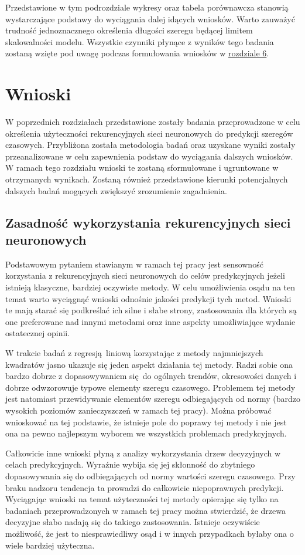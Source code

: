 \documentclass[10pt,a4paper]{article}
\begin{document}
Przedstawione w tym podrozdziale wykresy oraz tabela porównawcza stanowią wystarczające podstawy do wyciągania dalej idących wniosków. Warto zauważyć trudność jednoznacznego określenia długości szeregu będącej limitem skalowalności modelu. Wszystkie czynniki płynące z wyników tego badania zostaną wzięte pod uwagę podczas formułowania wniosków w \hyperlink{section.6}{rozdziale 6}.

\newpage
\section{Wnioski}
W poprzednich rozdziałach przedstawione zostały badania przeprowadzone w celu określenia użyteczności rekurencyjnych sieci neuronowych do predykcji szeregów czasowych. Przybliżona została metodologia badań oraz uzyskane wyniki zostały przeanalizowane w celu zapewnienia podstaw do wyciągania dalszych wniosków. W ramach tego rozdziału wnioski te zostaną sformułowane i ugruntowane w otrzymanych wynikach. Zostaną również przedstawione kierunki potencjalnych dalszych badań mogących zwiększyć zrozumienie zagadnienia.

\subsection{Zasadność wykorzystania rekurencyjnych sieci neuronowych}
Podstawowym pytaniem stawianym w ramach tej pracy jest sensowność korzystania z rekurencyjnych sieci neuronowych do celów predykcyjnych jeżeli istnieją klasyczne, bardziej oczywiste metody. W celu umożliwienia osądu na ten temat warto wyciągnąć wnioski odnośnie jakości predykcji tych metod. Wnioski te mają starać się podkreślać ich silne i słabe strony, zastosowania dla których są one preferowane nad innymi metodami oraz inne aspekty umożliwiające wydanie ostatecznej opinii.

W trakcie badań z regresją liniową korzystając z metody najmniejszych kwadratów jasno ukazuje się jeden aspekt działania tej metody. Radzi sobie ona bardzo dobrze z dopasowywaniem się do ogólnych trendów, okresowości danych i dobrze odwzorowuje typowe elementy szeregu czasowego. Problemem tej metody jest natomiast przewidywanie elementów szeregu odbiegających od normy (bardzo wysokich poziomów zanieczyszczeń w ramach tej pracy). Można próbować wnioskować na tej podstawie, że istnieje pole do poprawy tej metody i nie jest ona na pewno najlepszym wyborem we wszystkich problemach predykcyjnych. 

Całkowicie inne wnioski płyną z analizy wykorzystania drzew decyzyjnych w celach predykcyjnych. Wyraźnie wybija się jej skłonność do zbytniego dopasowywania się do odbiegających od normy wartości szeregu czasowego. Przy braku nadzoru tendencja ta prowadzi do całkowicie niepoprawnych predykcji. Wyciągając wnioski na temat użyteczności tej metody opierając się tylko na badaniach przeprowadzonych w ramach tej pracy można stwierdzić, że drzewa decyzyjne słabo nadają się do takiego zastosowania. Istnieje oczywiście możliwość, że jest to niesprawiedliwy osąd i w innych przypadkach byłaby ona o wiele bardziej użyteczna.
\end{document}
